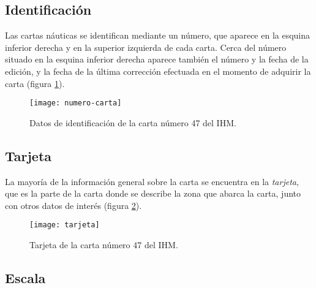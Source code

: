 \subsection{Identificación }


Las cartas náuticas se identifican mediante un número, que aparece en la esquina inferior 
derecha y en la superior izquierda de cada carta. Cerca del número situado en la esquina 
inferior derecha aparece también el número y la fecha de la edición, y la fecha de la última 
corrección efectuada en el momento de adquirir la carta (figura \ref{fg:id-carta}). 

\begin{figure}[htbp]
\begin{center}
\texttt{[image: numero-carta]}\\
\caption{Datos de identificación de la carta número 47 del IHM.}
\label{fg:id-carta}
\end{center}
\end{figure}

\subsection{Tarjeta}
 

La mayoría de la información general sobre la carta se encuentra en la \emph{tarjeta}, que es la 
parte de la carta donde se describe la zona que abarca la carta, junto con otros datos de 
interés (figura \ref{fg:tarjeta}). 

\begin{figure}[hbtp]
\begin{center}
\texttt{[image: tarjeta]}\\
\caption{Tarjeta de la carta número 47 del IHM.}
\label{fg:tarjeta}
\end{center}
\end{figure}

\subsection{Escala}


